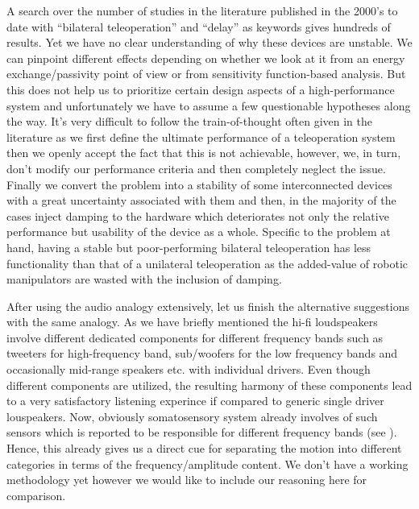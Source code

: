 A search over the number of studies in the literature published in the 2000's to date with \enquote{bilateral teleoperation} and 
\enquote{delay} as keywords gives hundreds of results. Yet we have no clear understanding of why these devices are unstable. We 
can pinpoint different effects depending on whether we look at it from an energy exchange/passivity point of view or from 
sensitivity function-based analysis. But this does not help us to prioritize certain design aspects of a high-performance system
and unfortunately we have to assume a few questionable hypotheses along the way. It's very difficult to follow the train-of-thought
often given in the literature as we first define the ultimate performance of a teleoperation system then we openly accept the fact that
this is not achievable, however, we, in turn, don't modify our performance criteria and then completely neglect the issue. Finally we 
convert the problem into a stability of some interconnected devices with a great uncertainty associated with them and then, in the majority
of the cases inject damping to the hardware which deteriorates not only the relative performance but usability of the device as a whole.
Specific to the problem at hand, having a stable but poor-performing bilateral teleoperation has less functionality than that of a 
unilateral teleoperation as the added-value of robotic manipulators are wasted with the inclusion of damping. 


After using the audio analogy extensively, let us finish the alternative suggestions with the same analogy. As we have briefly mentioned
the hi-fi loudspeakers involve different dedicated components for different frequency bands such as tweeters for high-frequency band,
sub/woofers for the low frequency bands and occasionally mid-range speakers etc. with individual drivers. Even though different components are 
utilized, the resulting harmony of these components lead to a very satisfactory listening experince if compared to generic single driver
louspeakers. Now, obviously somatosensory system already involves of such sensors which is reported to be responsible for different 
frequency bands (see ). Hence, this already gives us a direct cue for separating the motion into different categories 
in terms of the frequency/amplitude content. We don't have a working methodology yet however we would like to include our reasoning here
for comparison. 



